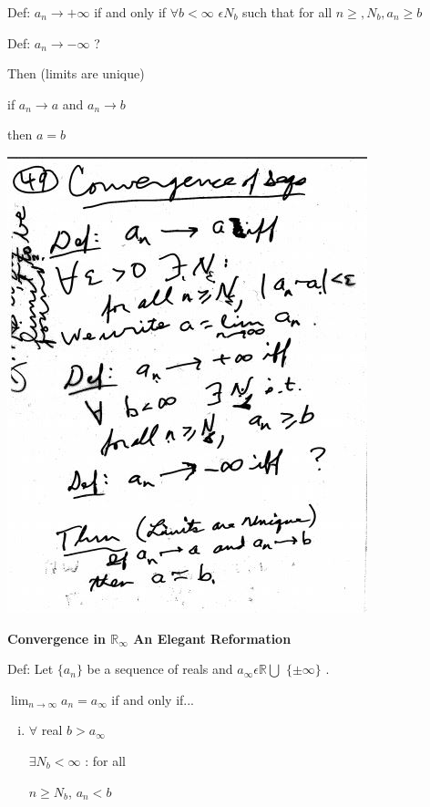 \documentclass[10pt,a4paper]{article}
\begin{document}
{{Def: $a_{n} \rightarrow + \infty$ if and only if $\forall b < \infty$ $\epsilon N_{b}$ such that for all $n \geq , N_{b} , a_{n} \geq b$ 

Def: $a_{n} \rightarrow - \infty$ ?

Then (limits are unique)

if $a_{n} \rightarrow a$ and $a_{n} \rightarrow b$

then $a=b$

\includegraphics[scale=.8]{Pages/S&L_page49(1)}

\newpage

{\bf Convergence in $\mathbb {R}_{\infty}$ An Elegant Reformation}

Def: Let $\{ a_{n} \}$ be a sequence of reals and $a_{\infty} \epsilon \mathbb {R} \bigcup$ $\{  \pm \infty \}$ .

$\lim_{n \rightarrow \infty} a_{n} = a_{\infty}$ if and only if...

\begin{enumerate} [(i)]

\item $\forall$ real $b > a_{\infty}$

$\exists N_{b} < \infty$ : for all

$n \geq N_{b}$, $a_{n} < b$

\end{enumerate}

}}
\end{document}
